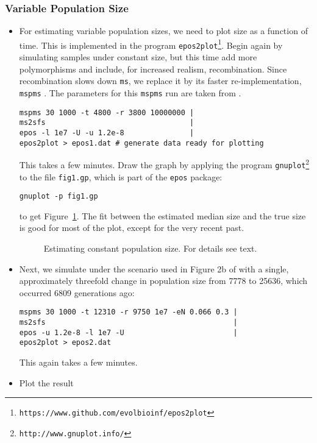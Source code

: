 \documentclass[a4paper, english]{article}
\newcommand{\ty}{\texttt}
\begin{document}
\subsubsection{Variable Population Size}
\begin{itemize}
  \item For estimating variable population sizes, we need to
    plot size as a function of time. This is implemented in the
    program \ty{epos2plot}\footnote{\ty{https://www.github.com/evolbioinf/epos2plot}}. Begin again by simulating samples under constant 
    size, but this time add more polymorphisms and include, for
    increased realism, recombination. Since recombination slows down
    \ty{ms}, we replace it by its faster re-implementation, \ty{mspms}
    \citep{kel16:eff}. The parameters for this \ty{mspms} run are
    taken from \citep[Figure 2a]{liu15:exp}.
\begin{verbatim}
mspms 30 1000 -t 4800 -r 3800 10000000 |
ms2sfs                                 |
epos -l 1e7 -U -u 1.2e-8               |
epos2plot > epos1.dat # generate data ready for plotting
\end{verbatim}
This takes a few minutes. Draw the graph by applying the program
\ty{gnuplot}\footnote{\ty{http://www.gnuplot.info/}} to the file
\ty{fig1.gp}, which is part of the \ty{epos} package:
\begin{verbatim}
gnuplot -p fig1.gp
\end{verbatim}
to get Figure~\ref{fig:con}. The fit between the estimated median size
and the true size is good for most of the plot, except for the very
recent past.
\begin{figure}
  \begin{center}
    \scalebox{0.6}{}
  \end{center}
  \caption{Estimating constant population size. For details see
  text.}\label{fig:con}
\end{figure}
\item Next, we simulate under the scenario used in Figure 2b of \cite{liu15:exp}
  with a single, approximately threefold change in population size
  from 7778 to 25636, which occurred 6809 generations ago:
\begin{verbatim}
mspms 30 1000 -t 12310 -r 9750 1e7 -eN 0.066 0.3 |
ms2sfs                                           |
epos -u 1.2e-8 -l 1e7 -U                         |
epos2plot > epos2.dat
\end{verbatim}
This again takes a few minutes.
\item Plot the result

\end{itemize}
\end{document}
